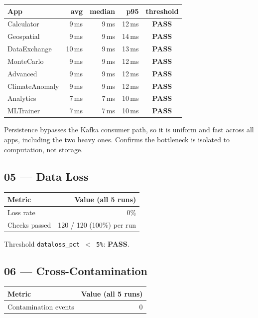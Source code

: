 \documentclass[11pt,a4paper]{article}
\newcommand{\pass}{\textcolor{pass}{\textbf{PASS}}}
\begin{document}
\begin{tabular}{@{}lrrrc@{}}
\toprule
\textbf{App} & \textbf{avg} & \textbf{median} & \textbf{p95} & \textbf{threshold} \\
\midrule
Calculator      & 9\,ms  & 9\,ms & 12\,ms & \pass \\
Geospatial      & 9\,ms  & 9\,ms & 14\,ms & \pass \\
DataExchange    & 10\,ms & 9\,ms & 13\,ms & \pass \\
MonteCarlo      & 9\,ms  & 9\,ms & 12\,ms & \pass \\
Advanced        & 9\,ms  & 9\,ms & 12\,ms & \pass \\
ClimateAnomaly  & 9\,ms  & 9\,ms & 12\,ms & \pass \\
Analytics       & 7\,ms  & 7\,ms & 10\,ms & \pass \\
MLTrainer       & 7\,ms  & 7\,ms & 10\,ms & \pass \\
\bottomrule
\end{tabular}

\medskip
\noindent Persistence bypasses the Kafka consumer path, so it is uniform and
fast across all apps, including the two heavy ones. Confirms the bottleneck is
isolated to computation, not storage.

\subsection{05 — Data Loss}

\begin{tabular}{@{}lr@{}}
\toprule
\textbf{Metric} & \textbf{Value (all 5 runs)} \\
\midrule
Loss rate     & 0\% \\
Checks passed & 120 / 120 (100\%) per run \\
\bottomrule
\end{tabular}

\medskip\noindent Threshold \texttt{dataloss\_pct $<$ 5\%}: \pass.

\subsection{06 — Cross-Contamination}

\begin{tabular}{@{}lr@{}}
\toprule
\textbf{Metric} & \textbf{Value (all 5 runs)} \\
\midrule
Contamination events & 0 \\
\bottomrule
\end{tabular}
\end{document}
